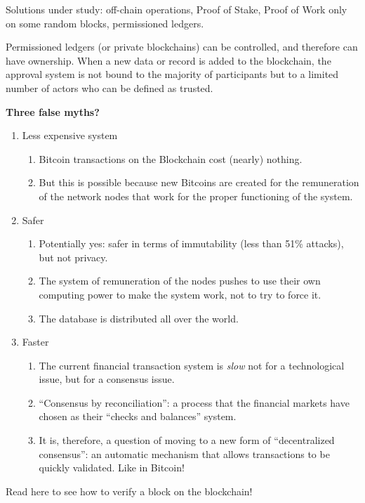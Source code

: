 Solutions under study: off-chain operations, Proof of Stake, Proof of Work only on some random blocks, permissioned ledgers.

Permissioned ledgers (or private blockchains) can be controlled, and therefore can have ownership. When a new data or record is added to the blockchain, the approval system is not bound to the majority of participants but to a limited number of actors who can be defined as trusted.

\textbf{Three false myths?}
\begin{enumerate}
	\item Less expensive system
	      \begin{enumerate}
	      	\item Bitcoin transactions on the Blockchain cost (nearly) nothing.
	      	\item But this is possible because new Bitcoins are created for the remuneration of the network nodes that work for the proper functioning of the system.
	      \end{enumerate}
	\item Safer
	      \begin{enumerate}
	      	\item Potentially yes: safer in terms of immutability (less than 51\% attacks), but not privacy.
	      	\item The system of remuneration of the nodes pushes to use their own computing power to make the system work, not to try to force it.
	      	\item The database is distributed all over the world.
	      \end{enumerate}
	\item Faster
	      \begin{enumerate}
	      	\item The current financial transaction system is \textit{slow} not for a technological issue, but for a consensus issue.
	      	\item ``Consensus by reconciliation'': a process that the financial markets have chosen as their ``checks and balances'' system.
	      	\item It is, therefore, a question of moving to a new form of ``decentralized consensus'': an automatic mechanism that allows transactions to be quickly validated. Like in Bitcoin!
	      \end{enumerate}
\end{enumerate}

Read here to see how to verify a block on the blockchain!

